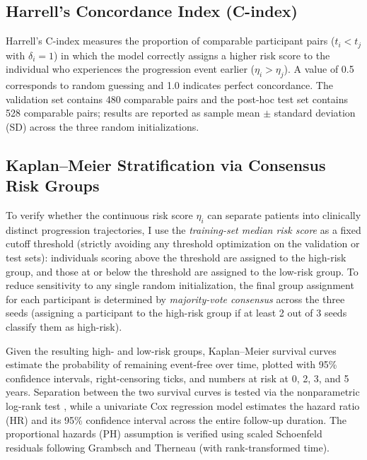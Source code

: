 \subsection{Harrell's Concordance Index (C-index)}
Harrell's C-index \cite{harrell1996multivariable} measures the proportion of comparable participant pairs ($t_i<t_j$ with $\delta_i=1$) in which the model correctly assigns a higher risk score to the individual who experiences the progression event earlier ($\eta_i>\eta_j$). A value of 0.5 corresponds to random guessing and 1.0 indicates perfect concordance. The validation set contains 480 comparable pairs and the post-hoc test set contains 528 comparable pairs; results are reported as sample mean $\pm$ standard deviation (SD) across the three random initializations.

\subsection{Kaplan--Meier Stratification via Consensus Risk Groups}
To verify whether the continuous risk score $\eta_i$ can separate patients into clinically distinct progression trajectories, I use the \emph{training-set median risk score} as a fixed cutoff threshold (strictly avoiding any threshold optimization on the validation or test sets): individuals scoring above the threshold are assigned to the high-risk group, and those at or below the threshold are assigned to the low-risk group. To reduce sensitivity to any single random initialization, the final group assignment for each participant is determined by \emph{majority-vote consensus} across the three seeds (assigning a participant to the high-risk group if at least 2 out of 3 seeds classify them as high-risk).

Given the resulting high- and low-risk groups, Kaplan--Meier survival curves \cite{kaplan1958nonparametric} estimate the probability of remaining event-free over time, plotted with 95\% confidence intervals, right-censoring ticks, and numbers at risk at 0, 2, 3, and 5 years. Separation between the two survival curves is tested via the nonparametric log-rank test \cite{peto1977design}, while a univariate Cox regression model estimates the hazard ratio (HR) and its 95\% confidence interval across the entire follow-up duration. The proportional hazards (PH) assumption is verified using scaled Schoenfeld residuals following Grambsch and Therneau \cite{grambsch1994proportional} (with rank-transformed time).

